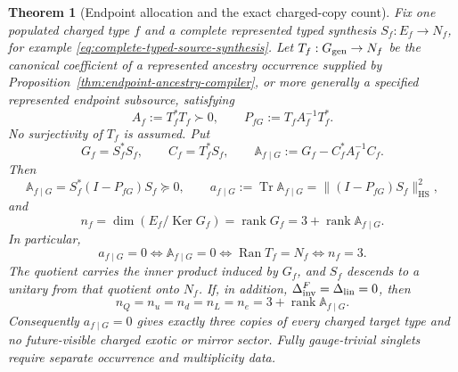 \documentclass[11pt]{article}
\numberwithin{equation}{section}
\newtheorem{theorem}{Theorem}[section]
\theoremstyle{definition}
\theoremstyle{remark}
\newcommand{\Tr}{\operatorname{Tr}}
\newcommand{\rank}{\operatorname{rank}}
\newcommand{\Ker}{\operatorname{Ker}}
\newcommand{\Ran}{\operatorname{Ran}}
\newcommand{\HS}{\mathrm{HS}}
\begin{document}
\begin{theorem}[Endpoint allocation and the exact charged-copy count]
\label{thm:endpoint-allocation}
Fix one populated charged type $f$ and a complete represented typed synthesis
$S_f:E_f\to N_f$, for example \eqref{eq:complete-typed-source-synthesis}.
Let $T_f:G_{\rm gen}\to N_f$ be the canonical coefficient of a represented
ancestry occurrence supplied by Proposition~\ref{thm:endpoint-ancestry-compiler},
or more generally a specified represented endpoint subsource, satisfying
\begin{equation}
 A_f:=T_f^*T_f\succ0,\qquad
 P_{fG}:=T_fA_f^{-1}T_f^*.
 \label{eq:endpoint-subsource-projector}
\end{equation}
No surjectivity of $T_f$ is assumed.  Put
\begin{equation}
 G_f=S_f^*S_f,\qquad C_f=T_f^*S_f,\qquad
 \mathbb A_{f\mid G}:=G_f-C_f^*A_f^{-1}C_f.
 \label{eq:endpoint-allocation-short}
\end{equation}
Then
\begin{equation}
 \mathbb A_{f\mid G}
        =S_f^*(I-P_{fG})S_f\succeq0,\qquad
 a_{f\mid G}:=\Tr\mathbb A_{f\mid G}
        =\|(I-P_{fG})S_f\|_{\HS}^2,
 \label{eq:endpoint-allocation-positive}
\end{equation}
and
\begin{equation}
 n_f=\dim(E_f/\Ker G_f)=\rank G_f
       =3+\rank\mathbb A_{f\mid G}.
 \label{eq:endpoint-generation-excess}
\end{equation}
In particular,
\begin{equation}
 a_{f\mid G}=0
 \iff\mathbb A_{f\mid G}=0
 \iff\Ran T_f=N_f
 \iff n_f=3.
 \label{eq:endpoint-allocation-zero}
\end{equation}
The quotient carries the inner product induced by $G_f$, and $S_f$ descends
to a unitary from that quotient onto $N_f$.
If, in addition, $\Delta_{\rm inv}^F=\Delta_{\rm lin}=0$, then
\begin{equation}
 n_Q=n_u=n_d=n_L=n_e=3+\rank\mathbb A_{f\mid G}.
 \label{eq:allocation-anomaly-excess}
\end{equation}
Consequently $a_{f\mid G}=0$ gives exactly three copies of every charged
target type and no future-visible charged exotic or mirror sector.
Fully gauge-trivial singlets require separate occurrence and multiplicity data.
\end{theorem}
\end{document}
